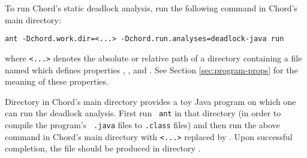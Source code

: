 To run Chord's static deadlock analysis,  run the following
command in Chord's main directory:

\begin{framed}
\begin{verbatim}
ant -Dchord.work.dir=<...> -Dchord.run.analyses=deadlock-java run
\end{verbatim}
\end{framed}

where {\tt <...>} denotes the absolute or relative path of a directory
containing a file named  which defines
properties , , and
.  See Section \ref{sec:program-props} for the
meaning of these properties.

Directory  in Chord's main directory provides a toy Java
program on which one can run the deadlock analysis.  First run {\tt
  ant} in that directory (in order to compile the program's {\tt
  .java} files to {\tt .class} files) and then run the above command
in Chord's main directory with {\tt <...>} replaced by
.  Upon successful completion, the
file  should be produced in directory
.

